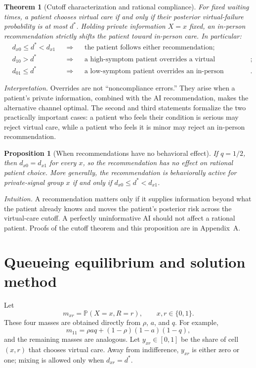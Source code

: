 \documentclass[11pt]{article}
\newcommand{\Prb}{\mathbb{P}}
\newtheorem{theorem}{Theorem}
\newtheorem{proposition}{Proposition}
\begin{document}
\begin{theorem}[Cutoff characterization and rational compliance]
For fixed waiting times, a patient chooses virtual care if and only if their posterior virtual-failure probability is at most $d^*$.  Holding private information $X=x$ fixed, an in-person recommendation strictly shifts the patient toward in-person care.  In particular:
\begin{align*}
 &d_{x0}\leq d^*<d_{x1}
 &&\Longrightarrow&& \text{the patient follows either recommendation};\\
 &d_{10}>d^*
 &&\Longrightarrow&& \text{a high-symptom patient overrides a virtual recommendation};\\
 &d_{01}\leq d^*
 &&\Longrightarrow&& \text{a low-symptom patient overrides an in-person recommendation}.
\end{align*}
\end{theorem}

\noindent\emph{Interpretation.}  Overrides are not ``noncompliance errors.''  They arise when a patient's private information, combined with the AI recommendation, makes the alternative channel optimal.  The second and third statements formalize the two practically important cases: a patient who feels their condition is serious may reject virtual care, while a patient who feels it is minor may reject an in-person recommendation.

\begin{proposition}[When recommendations have no behavioral effect]
If $q=1/2$, then $d_{x0}=d_{x1}$ for every $x$, so the recommendation has no effect on rational patient choice.  More generally, the recommendation is behaviorally active for private-signal group $x$ if and only if $d_{x0}\leq d^*<d_{x1}$.
\end{proposition}

\noindent\emph{Intuition.}  A recommendation matters only if it supplies information beyond what the patient already knows and moves the patient's posterior risk across the virtual-care cutoff.  A perfectly uninformative AI should not affect a rational patient.  Proofs of the cutoff theorem and this proposition are in Appendix~A.

\section{Queueing equilibrium and solution method}

Let
\begin{equation}
 m_{xr}=\Prb(X=x,R=r), \qquad x,r\in\{0,1\}.
 \label{eq:cellmass}
\end{equation}
These four masses are obtained directly from $\rho$, $a$, and $q$.  For example,
\[
 m_{11}=\rho aq+(1-\rho)(1-a)(1-q),
\]
and the remaining masses are analogous.  Let $y_{xr}\in[0,1]$ be the share of cell $(x,r)$ that chooses virtual care.  Away from indifference, $y_{xr}$ is either zero or one; mixing is allowed only when $d_{xr}=d^*$.
\end{document}
